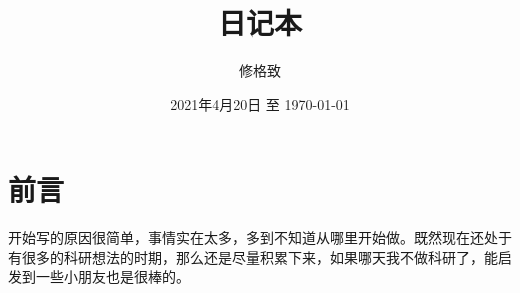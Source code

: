 \documentclass{report}
\title{日记本}
\author{修格致}
\date{2021年4月20日 至 \today}
\begin{document}
\maketitle


\tableofcontents
\newpage

\section{前言}

开始写的原因很简单，事情实在太多，多到不知道从哪里开始做。既然现在还处于有很多的科研想法的时期，那么还是尽量积累下来，如果哪天我不做科研了，能启发到一些小朋友也是很棒的。






\end{document}
